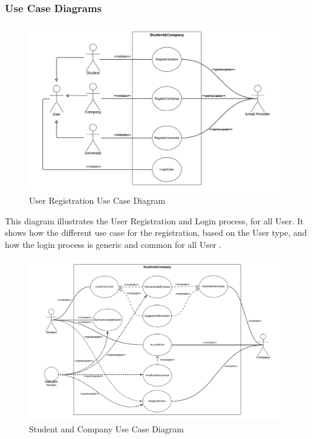 \subsubsection{Use Case Diagrams}
\begin{figure}[H]
    \centering
    \includegraphics[width=1 \textwidth]{Diagrams/UseDiagrams/UserRegistrationUseCase.png}
    \caption{User Registration Use Case Diagram}
    \label{fig:UserRegistrationUseCaseDiagram}
\end{figure}
This diagram illustrates the User Registration and Login process, for all User. It shows how the different use case for the registration, based on the User type, and how the login process is generic and common for all User
\clearpage.
\begin{figure}[H]
    \centering
    \includegraphics[width=1 \textwidth]{Diagrams/UseDiagrams/Student Company Use Case.png}
    \caption{Student and Company Use Case Diagram}
    \label{fig:StudentCompanyUseCaseDiagram}
\end{figure}
